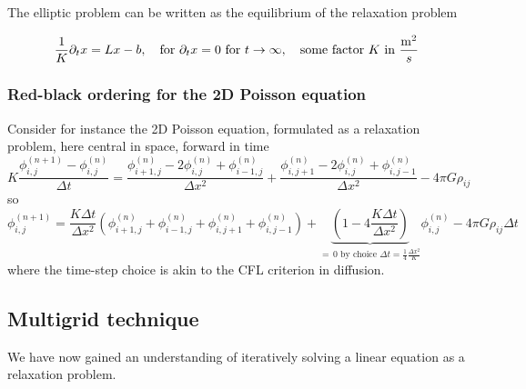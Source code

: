 The elliptic problem can be written as the equilibrium of the relaxation problem

\begin{equation}
    \frac{1}{K} \partial_t x = L x - b, \quad \text{for } \partial_t x = 0 \text{ for } t \rightarrow \infty, \quad \text{some factor } K \text{ in } \frac{\operatorname{m}^2}{s}
\end{equation}

\subsubsection{Red-black ordering for the 2D Poisson equation}
Consider for instance the 2D Poisson equation, formulated as a relaxation problem, here central in space,
forward in time
\begin{equation}
    K \frac{\phi_{i, j}^{(n+1)}-\phi_{i, j}^{(n)}}{\Delta t}=\frac{\phi_{i+1, j}^{(n)}-2 \phi_{i, j}^{(n)}+\phi_{i-1, j}^{(n)}}{\Delta x^2}+\frac{\phi_{i, j+1}^{(n)}-2 \phi_{i, j}^{(n)}+\phi_{i, j-1}^{(n)}}{\Delta x^2}-4 \pi G \rho_{i j}
\end{equation}
so
\begin{equation}
    \label{eq:2dpoisson_disc}
    \phi_{i, j}^{(n+1)}=\frac{K \Delta t}{\Delta x^2}\left(\phi_{i+1, j}^{(n)}+\phi_{i-1, j}^{(n)}+\phi_{i, j+1}^{(n)}+\phi_{i, j-1}^{(n)}\right)+\underbrace{\left(1-4 \frac{K \Delta t}{\Delta x^2}\right)}_{= \, 0 \text{ by choice } \Delta t = \frac{1}{4} \frac{\Delta x^2}{K}} \phi_{i, j}^{(n)}-4 \pi G \rho_{i j} \Delta t
\end{equation}
where the time-step choice is akin to the CFL criterion in diffusion.

\subsection{Multigrid technique}
We have now gained an understanding of iteratively
solving a linear equation as a relaxation problem.


